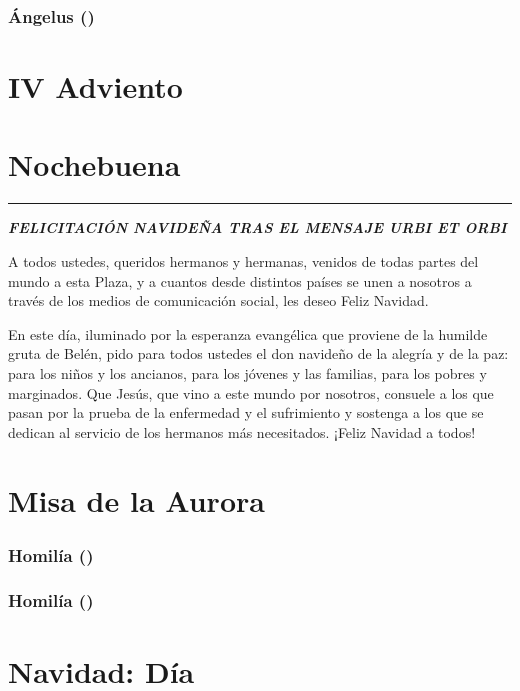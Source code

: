 \subsubsection{Ángelus ()}

\section{IV Adviento} 


\section{Nochebuena} 

\begin{center}\rule{0.5\linewidth}{\linethickness}\end{center}

\textbf{\emph{FELICITACIÓN NAVIDEÑA TRAS EL MENSAJE URBI ET ORBI}}

A todos ustedes, queridos hermanos y hermanas, venidos de todas partes del mundo a esta Plaza, y a cuantos desde distintos países se unen a nosotros a través de los medios de comunicación social, les deseo Feliz Navidad.

En este día, iluminado por la esperanza evangélica que proviene de la humilde gruta de Belén, pido para todos ustedes el don navideño de la alegría y de la paz: para los niños y los ancianos, para los jóvenes y las familias, para los pobres y marginados. Que Jesús, que vino a este mundo por nosotros, consuele a los que pasan por la prueba de la enfermedad y el sufrimiento y sostenga a los que se dedican al servicio de los hermanos más necesitados. ¡Feliz Navidad a todos!

\section{Misa de la Aurora} 


\subsubsection{Homilía ()}

\subsubsection{Homilía ()}

\section{Navidad: Día} 



